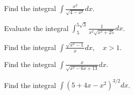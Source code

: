 \documentclass[
  course = {{MATH102 Calculus II}},
  quartile = {{2}},
  assignment = {{Section 7.3}},%
  topic = {{Trigonometric Substitution}},
  firstexercise = 1,
  term = 203
]{../class/aga-homework}
\begin{document}
\fbox{
\begin{minipage}{\textwidth}

\mbox{}

\vspace{1mm}

\[
\displaystyle
\text{For },\sqrt{a^2-x^2}, \quad \text{ use } \quad x = a\sin\theta, \quad 0\leq \theta \leq \pi.
\]
\vspace{1mm}

\[
\displaystyle
\text{For },\sqrt{a^2+x^2}, \quad \text{ use } \quad x = a\tan\theta, \quad -\frac{\pi}{2}< \theta <\frac{\pi}{2}.
\]
\vspace{1mm}


\[
\displaystyle
\text{For },\sqrt{x^2-a^2}, \quad \text{ use } \quad x = a\sec\theta, \quad 0\leq \theta < \frac{\pi}{2} \text{ or }\pi \leq \theta <\frac{3\pi}{2}.
\]
\vspace{1mm}
\end{minipage}
}

\newpage

\problem Find the integral $\displaystyle \int \frac{x^2}{\sqrt{4-x^2}} dx $.

\newpage

\problem Evaluate the integral $\displaystyle \int_{5}^{5\sqrt{3}} \frac{1}{x^2\sqrt{x^2+25}} dx $.

\newpage

\problem Find the integral $\displaystyle \int \frac{\sqrt{x^2-1}}{x} dx,\quad x>1 $.

\newpage

\problem Find the integral $\displaystyle \int \frac{x}{\sqrt{x^2-6x+13}} dx $.

\newpage

\problem Find the integral $\displaystyle \int (5+4x-x^2)^{3/2} dx $.

\afterpage{\null\newpage}

\afterpage{\null\newpage}

\afterpage{\null\newpage}
\end{document}
